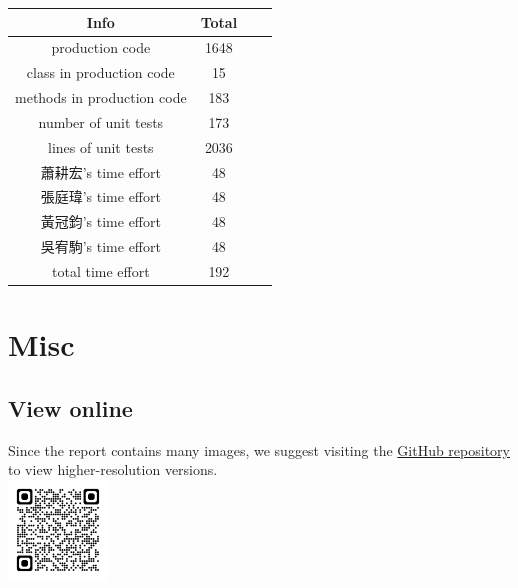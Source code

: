 \documentclass[12pt]{article}
\begin{document}
    \begin{CJK*}{UTF8}{bsmi}
        \begin{longtable}{|c|c|c|c|}
            \hline
            Info                       & Total \\
            \hline
            \endfirsthead
            \endhead
            \hline
            production code            & 1648  \\
            class in production code   & 15    \\
            methods in production code & 183   \\
            number of unit tests       & 173   \\
            lines of unit tests        & 2036  \\
            蕭耕宏's time effort          & 48    \\
            張庭瑋's time effort          & 48    \\
            黃冠鈞's time effort          & 48    \\
            吳宥駒's time effort          & 48    \\
            total time effort          & 192   \\
            \hline
        \end{longtable}
    \end{CJK*}




    \section{Misc}

    \subsection{View online}
    Since the report contains many images, we suggest visiting the \href{https://github.com/CSIEHaTerX/Dr.UML/}{GitHub repository} to view higher-resolution versions.\\
    \includegraphics[]{assets/repoQRCode.png}
\end{document}
